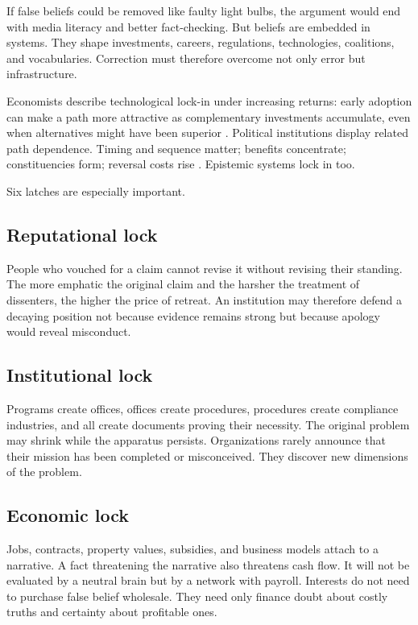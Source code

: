 ﻿\documentclass[12pt,a4paper]{book}
\begin{document}
If false beliefs could be removed like faulty light bulbs, the argument would end with media literacy and better fact-checking. But beliefs are embedded in systems. They shape investments, careers, regulations, technologies, coalitions, and vocabularies. Correction must therefore overcome not only error but infrastructure.

Economists describe technological lock-in under increasing returns: early adoption can make a path more attractive as complementary investments accumulate, even when alternatives might have been superior \cite{Arthur1989}. Political institutions display related path dependence. Timing and sequence matter; benefits concentrate; constituencies form; reversal costs rise \cite{Pierson2000}. Epistemic systems lock in too.

Six latches are especially important.

\subsection{Reputational lock}

People who vouched for a claim cannot revise it without revising their standing. The more emphatic the original claim and the harsher the treatment of dissenters, the higher the price of retreat. An institution may therefore defend a decaying position not because evidence remains strong but because apology would reveal misconduct.

\subsection{Institutional lock}

Programs create offices, offices create procedures, procedures create compliance industries, and all create documents proving their necessity. The original problem may shrink while the apparatus persists. Organizations rarely announce that their mission has been completed or misconceived. They discover new dimensions of the problem.

\subsection{Economic lock}

Jobs, contracts, property values, subsidies, and business models attach to a narrative. A fact threatening the narrative also threatens cash flow. It will not be evaluated by a neutral brain but by a network with payroll. Interests do not need to purchase false belief wholesale. They need only finance doubt about costly truths and certainty about profitable ones.
\end{document}
